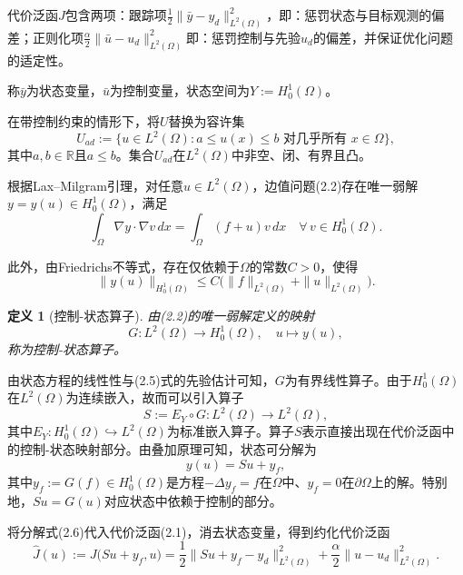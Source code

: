 \documentclass{xmu}
\theoremstyle{plain}
\newtheorem{definition}[theorem]{定义}
\theoremstyle{remark}
\begin{document}
代价泛函$J$包含两项：跟踪项$\frac{1}{2}\|\bar{y} - y_d\|^2_{L^2(\Omega)}$，即：惩罚状态与目标观测的偏差；正则化项$\frac{\alpha}{2}\|\bar{u} - u_d\|^2_{L^2(\Omega)}$即：惩罚控制与先验$u_d$的偏差，并保证优化问题的适定性。

称$\bar{y}$为状态变量，$\bar{u}$为控制变量，状态空间为$Y := H^1_0(\Omega)$。

在带控制约束的情形下，将$U$替换为容许集
\begin{equation}
U_{ad} := \bigl\{ u \in L^2(\Omega) : a \le u(x) \le b \text{ 对几乎所有 } x \in \Omega \bigr\},
\end{equation}
其中$a, b \in \mathbb{R}$且$a \le b$。集合$U_{ad}$在$L^2(\Omega)$中非空、闭、有界且凸。

根据Lax–Milgram引理，对任意$u \in L^2(\Omega)$，边值问题(2.2)存在唯一弱解$y = y(u) \in H^1_0(\Omega)$，满足
\begin{equation}
\int_\Omega \nabla y \cdot \nabla v \, dx = \int_\Omega (f + u) v \, dx \quad \forall\, v \in H^1_0(\Omega).
\end{equation}

此外，由Friedrichs不等式，存在仅依赖于$\Omega$的常数$C > 0$，使得
\begin{equation}
\|y(u)\|_{H^1_0(\Omega)} \le C \bigl( \|f\|_{L^2(\Omega)} + \|u\|_{L^2(\Omega)} \bigr).
\end{equation}

\begin{definition}[控制-状态算子]
由(2.2)的唯一弱解定义的映射
$$ G : L^2(\Omega) \to H^1_0(\Omega), \quad u \mapsto y(u), $$
称为控制-状态算子。
\end{definition}

由状态方程的线性性与(2.5)式的先验估计可知，$G$为有界线性算子。由于$H^1_0(\Omega)$在$L^2(\Omega)$为连续嵌入，故而可以引入算子
$$ S := E_Y \circ G : L^2(\Omega) \to L^2(\Omega), $$
其中$E_Y : H^1_0(\Omega) \hookrightarrow L^2(\Omega)$为标准嵌入算子。算子$S$表示直接出现在代价泛函中的控制-状态映射部分。由叠加原理可知，状态可分解为
\begin{equation}
y(u) = S u + y_f,
\end{equation}
其中$y_f := G(f) \in H^1_0(\Omega)$是方程$-\Delta y_f = f$在$\Omega$中、$y_f = 0$在$\partial\Omega$上的解。特别地，$S u = G(u)$对应状态中依赖于控制的部分。

将分解式(2.6)代入代价泛函(2.1)，消去状态变量，得到约化代价泛函
\begin{equation}
\hat{J}(u) := J\bigl(S u + y_f, u\bigr) = \frac{1}{2} \|S u + y_f - y_d\|^2_{L^2(\Omega)} + \frac{\alpha}{2} \|u - u_d\|^2_{L^2(\Omega)}.
\end{equation}
\end{document}
